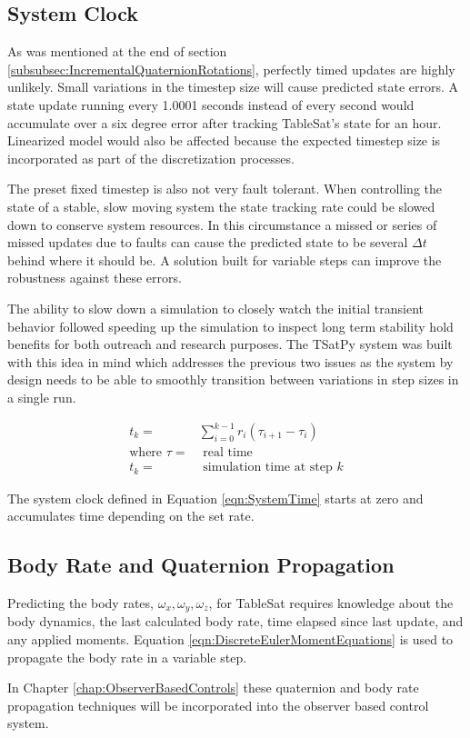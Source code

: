 \subsection{System Clock}
\label{subsec:SystemClock}

As was mentioned at the end of section \ref{subsubsec:IncrementalQuaternionRotations}, perfectly timed updates are highly unlikely.  Small variations in the timestep size will cause predicted state errors.  A state update running every 1.0001 seconds instead of every second would accumulate over a six degree error after tracking TableSat's state for an hour.  Linearized model would also be affected because the expected timestep size is incorporated as part of the discretization processes.

The preset fixed timestep is also not very fault tolerant.  When controlling the state of a stable, slow moving system the state tracking rate could be slowed down to conserve system resources.  In this circumstance a missed or series of missed updates due to faults can cause the predicted state to be several $\Delta t$ behind where it should be.  A solution built for variable steps can improve the robustness against these errors.

The ability to slow down a simulation to closely watch the initial transient behavior followed speeding up the simulation to inspect long term stability hold benefits for both outreach and research purposes.  The TSatPy system was built with this idea in mind which addresses the previous two issues as the system by design needs to be able to smoothly transition between variations in step sizes in a single run.

\begin{equation}
  \begin{aligned}
    t_k =& \sum\limits_{i=0}^{k-1} r_i (\tau_{i+1} - \tau_i)\\
    \text{where } \tau =& \text{ real time} \\
    t_k =& \text{ simulation time at step }k
  \end{aligned}
  \label{eqn:SystemTime}
\end{equation}

The system clock defined in Equation \ref{eqn:SystemTime} starts at zero and accumulates time depending on the set rate.

\subsection{Body Rate and Quaternion Propagation}
\label{subsec:BodyRateQuaternionPropagation}

Predicting the body rates, $\omega_x, \omega_y, \omega_z$, for TableSat requires knowledge about the body dynamics, the last calculated body rate, time elapsed since last update, and any applied moments.  Equation \ref{eqn:DiscreteEulerMomentEquations} is used to propagate the body rate in a variable step.

In Chapter \ref{chap:ObserverBasedControls} these quaternion and body rate propagation techniques will be incorporated into the observer based control system.
